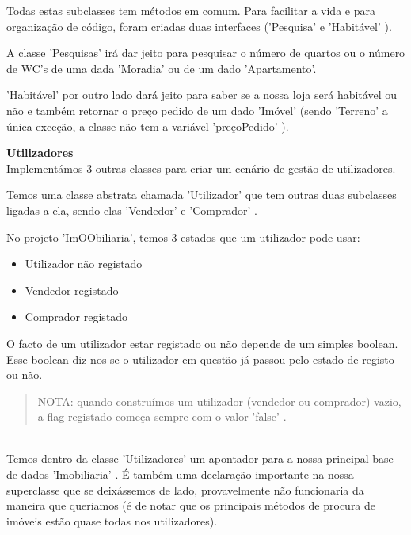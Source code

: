 \documentclass[12pt]{article}
\begin{document}
Todas estas subclasses tem métodos em comum. Para facilitar a vida e para organização de código, foram criadas duas interfaces ('Pesquisa' e 'Habitável' ).
\newline
\newline

A classe 'Pesquisas'  irá dar jeito para pesquisar o número de quartos ou o número de WC's de uma dada 'Moradia' ou de um dado 'Apartamento'.
\newline

'Habitável' por outro lado dará jeito para saber se a nossa loja será habitável ou não e também retornar o preço pedido de um dado 'Imóvel' (sendo 'Terreno' a única exceção, a classe não tem a variável 'preçoPedido' ).    

\pagebreak

\textbf{Utilizadores}
~\\

Implementámos 3 outras classes para criar um cenário de gestão de utilizadores. 
\newline

Temos uma classe abstrata chamada 'Utilizador' que tem outras duas subclasses ligadas a ela, sendo elas 'Vendedor' e 'Comprador' .
\newline

No projeto 'ImOObiliaria', temos 3 estados que um utilizador pode usar:
\newline
\begin{itemize}
\item Utilizador não registado
\item Vendedor registado
\item Comprador registado
\end{itemize}

O facto de um utilizador estar registado ou não depende de um simples boolean.\\ 

Esse boolean diz-nos se o utilizador em questão já passou pelo estado de registo ou não.
~\\
\newline
\begin{quote}
NOTA: quando construímos um utilizador (vendedor ou comprador) vazio, a flag registado começa sempre com o valor 'false' .
\end{quote}

~\\

Temos dentro da classe 'Utilizadores' um apontador para a nossa principal base de dados 'Imobiliaria' . 
É também uma declaração importante na nossa superclasse que se deixássemos de lado, provavelmente não funcionaria da maneira que queriamos (é de notar que os principais métodos de procura de imóveis estão quase todas nos utilizadores).
\newline
\end{document}
